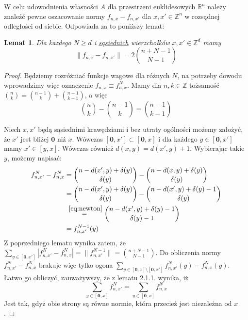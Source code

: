 \documentclass[licencjacka]{pracamgr}
\theoremstyle{definition}
\theoremstyle{definition}
\theoremstyle{definition}
\theoremstyle{definition}
\theoremstyle{definition}
\theoremstyle{plain}
\newtheorem{lemma}{Lemat}[section]
\theoremstyle{plain}
\begin{document}
W celu udowodnienia własności $ A $ dla przestrzeni euklidesowych $ \mathbb{R}^n $ 
należy znaleźć pewne oszacowanie normy $ f_{n,x} - f_{n,x'} $ dla $ x,x' \in 
\mathbb{Z}^n $ w rozsądnej odległości od siebie. Odpowiada za to poniższy lemat:

\begin{lemma}
	Dla każdego $ N \geq d $ i \underline{sąsiednich} wierzchołków $ x,x'\in \mathbb{Z}^d $
	mamy $$ \| f_{n,x} - f_{n,x'}\| = 2 {n + N - 1 \choose N -1} $$
\end{lemma}
\begin{proof}
	Będziemy rozróżniać funkcje wagowe dla różnych $ N $, na potrzeby dowodu wprowadzimy 
	więc oznaczenie $ f_{n,x} \equiv f_{n,x}^N $. Mamy dla $ n,k \in \mathbb{Z} $ tożsamość 
	$ {n \choose k } = {n -1\choose k} + {n-1 \choose k-1} $, a więc 
	\begin{equation} \label{eq:newton}
		{n \choose k} - {n -1\choose k} = {n - 1 \choose k - 1}
	\end{equation} 

	Niech $ x,x' $ będą sąsiednimi krawędziami i bez utraty ogólności możemy założyć, 
	że $ x'$ jest bliżej $ \textbf{0} $ niż $ x $. Wówczas $[\textbf{0}, x'] \subset 
	[\textbf{0},x]$ i dla każdego $ y \in [\textbf{0},x'] $ mamy $ x' \in [y,x] $.
	Wówczas również $ d(x,y) = d(x',y) + 1 $. Wybierając takie $ y $, możemy napisać:
	\begin{align*}
		f_{n,x'}^N - f_{n,x}^N & = {n - d(x',y) + \delta(y) \choose \delta(y)} - 
		{n - d(x,y) + \delta(y) \choose \delta(y)} \\
		&= {n - d(x',y) + \delta(y) \choose \delta(y)} - {n - d(x',y) + \delta(y) - 1 
		\choose \delta(y)} \\
		& \stackrel{~\ref{eq:newton}}{=} {n - d(x',y) + \delta(y) - 1 \choose \delta(y) - 1} \\
		& = f_{n,x'}^{N-1}(y)
	\end{align*}
	Z poprzedniego lematu wynika zatem, że $\sum_{y \in [\textbf{0}, x']} \left| 
	f_{n,x'}^N - f_{n,x}^N \right| = \| f_{n,x'}^{N-1}\| = {n + N - 1 \choose N - 1} $. Do 
	obliczenia normy $ f_{n,x'}^N - f_{n,x}^N $ brakuje więc tylko ogona 
	$ \sum_{y \in [\textbf{0},x] \setminus [\textbf{0}, x']} f_{n,x'}^N(y) - f_{n,x}^N(y) $. 
	Łatwo go obliczyć, zauważywszy, że z lematu 2.1.1. wynika, iż
	$$ \sum\limits_{y \in [\textbf{0},x]} f_{n,x'}^N =   
		\sum\limits_{y \in [\textbf{0},x]} f_{n,x}^N $$
	Jest tak, gdyż obie strony są równe normie, która przecież jest niezależna od $ x $.
	

\end{proof}
\end{document}
